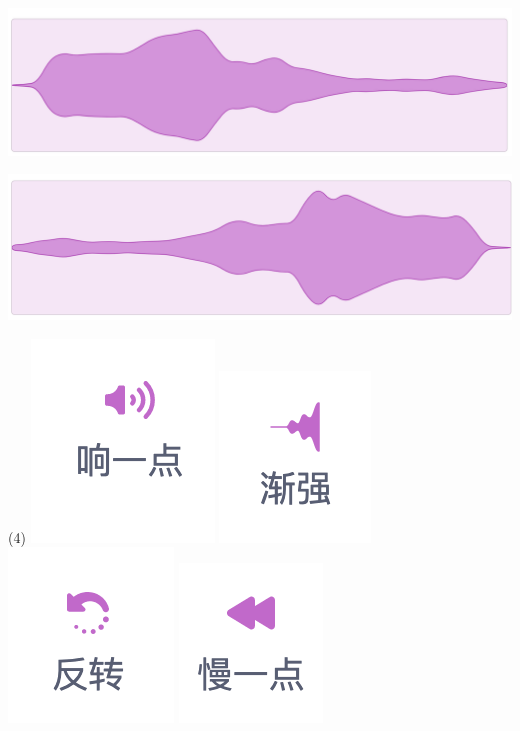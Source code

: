 \documentclass[10pt, a4paper]{article}
\begin{document}
\begin{enumerate}
        \begin{minipage}{.2\textwidth}
            \centering
            \includegraphics[width=\textwidth]{figure/16-1.png}
        \end{minipage}
        \begin{minipage}{.2\textwidth}
            \centering
            \includegraphics[width=\textwidth]{figure/16-2.png}
        \end{minipage}
        \begin{minipage}{.53\textwidth}
            \begin{tasks}(4)
                \task \includegraphics[width=.1\textwidth]{figure/16a.png}
                \task \includegraphics[width=.1\textwidth]{figure/16b.png}
                \task \includegraphics[width=.1\textwidth]{figure/16c.png}
                \task \includegraphics[width=.1\textwidth]{figure/16d.png}
            \end{tasks}
        \end{minipage}


\end{enumerate}
\end{document}
